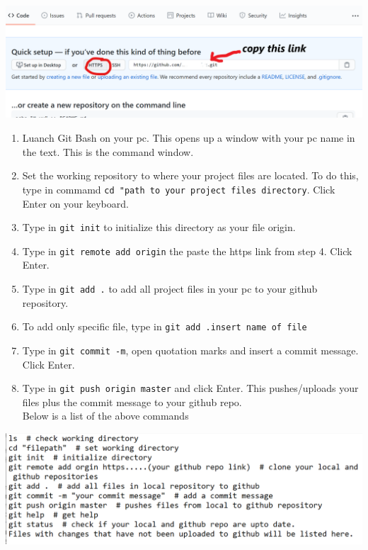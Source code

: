 \documentclass[
]{book}
\providecommand{\tightlist}{%
  \setlength{\itemsep}{0pt}\setlength{\parskip}{0pt}}
\let\origfigure\figure
\let\endorigfigure\endfigure
\renewenvironment{figure}[1][2] {
    \expandafter\origfigure\expandafter[H]
} {
    \endorigfigure
}
\begin{document}
\begin{figure}
\centering
\includegraphics{tutorial_screenshots/gh_repolink.png}
\caption{Repository url}
\end{figure}

\begin{enumerate}
\def\labelenumi{\arabic{enumi}.}
\setcounter{enumi}{3}
\tightlist
\item
  Luanch Git Bash on your pc. This opens up a window with your pc name in the text. This is the command window.\\
\item
  Set the working repository to where your project files are located. To do this, type in commamd \texttt{cd\ "path\ to\ your\ project\ files\ directory}. Click Enter on your keyboard.\\
\item
  Type in \texttt{git\ init} to initialize this directory as your file origin.\\
\item
  Type in \texttt{git\ remote\ add\ origin} the paste the https link from step 4. Click Enter.\\
\item
  Type in \texttt{git\ add\ .} to add all project files in your pc to your github repository.\\
\item
  To add only specific file, type in \texttt{git\ add\ .insert\ name\ of\ file}\\
\item
  Type in \texttt{git\ commit\ -m}, open quotation marks and insert a commit message. Click Enter.\\
\item
  Type in \texttt{git\ push\ origin\ master} and click Enter. This pushes/uploads your files plus the commit message to your github repo.\\
  Below is a list of the above commands
\end{enumerate}

\begin{figure}
\centering
\includegraphics{tutorial_screenshots/gh_bash_upload.png}
\caption{Upload files via git bash}
\end{figure}
\end{document}
